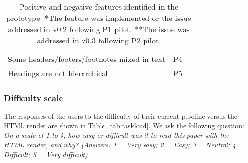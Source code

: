\begin{table}[t!]
\begin{tabularx}{\linewidth}{llp{60mm}}
        Some headers/footers/footnotes mixed in text & P4 & \\
        Headings are not hierarchical & P5 & \\
        \bottomrule
    \end{tabularx}
    \caption{Positive and negative features identified in the prototype. *The feature was implemented or the issue addressed in v0.2 following P1 pilot. **The issue was addressed in v0.3 following P2 pilot.}
    \label{tab:prototype_features}
\end{table}



\subsubsection*{Difficulty scale} 

The responses of the users to the difficulty of their current pipeline versus the HTML render are shown in Table~\ref{tab:taskload}. We ask the following question: \textit{On a scale of 1 to 5, how easy or difficult was it to read this paper with the HTML render, and why? (Answers: 1 = Very easy; 2 = Easy; 3 = Neutral; 4 = Difficult; 5 = Very difficult)}

